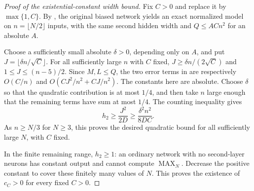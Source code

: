 \begin{proof}[Proof of the existential-constant width bound]
Fix $C>0$ and replace it by $\max\{1,C\}$. By
, the original biased network yields an exact
normalized model on $n=\lfloor N/2\rfloor$ inputs, with the same second
hidden width and $Q\le ACn^2$ for an absolute $A$.

Choose a sufficiently small absolute $\delta>0$, depending only on $A$,
and put $J=\lfloor\delta n/\sqrt C\rfloor$. For all sufficiently large
$n$ with $C$ fixed, $J\ge\delta n/(2\sqrt C)$ and $1\le J\le(n-5)/2$.
Since $M,L\le Q$, the two error terms in
 are respectively
$O(C/n)$ and $O(CJ^2/n^2+CJ/n^2)$. The constants here are absolute.
Choose $\delta$ so that the quadratic contribution is at most $1/4$,
and then take $n$ large enough that the remaining terms have sum at most
$1/4$. The counting inequality gives
\[
 h_2\ge \frac{J^2}{2D}
      \ge \frac{\delta^2 n^2}{8DC}.
\]
As $n\ge N/3$ for $N\ge3$, this proves the desired quadratic bound
for all sufficiently large $N$, with $C$ fixed.

In the finite remaining range, $h_2\ge1$: an ordinary network with no
second-layer neurons has constant output and cannot compute
$\operatorname{MAX}_N$. Decrease the positive constant to cover these
finitely many values of $N$. This proves the existence of $c_C>0$ for
every fixed $C>0$.
\end{proof}
